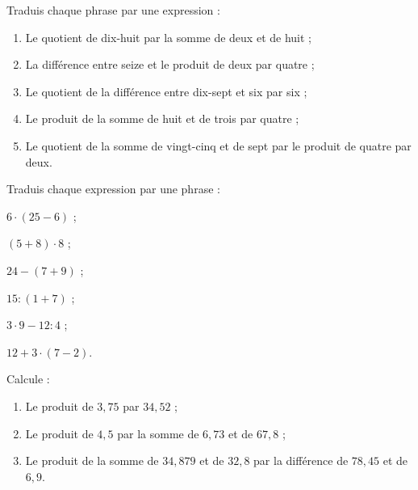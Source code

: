 \begin{exercice}
Traduis chaque phrase par une expression :
\begin{enumerate}
 \item Le quotient de dix-huit par la somme de deux et de huit ;
 \item La différence entre seize et le produit de deux par quatre ;
 \item Le quotient de la différence entre dix-sept et six par six ;
 \item Le produit de la somme de huit et de trois par quatre ;
 \item Le quotient de la somme de vingt-cinq et de sept par le produit de quatre par deux.
 \end{enumerate}
\end{exercice}


\begin{exercice}
Traduis chaque expression par une phrase :
\begin{colenumerate}{2}
 \item $6 \cdot (25 - 6)$ ;
 \item $(5 + 8) \cdot 8$ ;
 \item $24 - (7 + 9)$ ;
 \item $15 : (1 + 7)$ ;
 \item $3 \cdot 9 - 12 : 4$ ;
 \item $12 + 3 \cdot (7 - 2)$.
 \end{colenumerate}
\end{exercice} 


\begin{exercice}
Calcule :
\begin{enumerate}
 \item Le produit de $3,75$ par $34,52$ ;
 \item Le produit de $4,5$ par la somme de $6,73$ et de $67,8$ ;
 \item Le produit de la somme de $34,879$ et de $32,8$ par la différence de $78,45$ et de $6,9$.
 \end{enumerate}
\end{exercice} 





\vspace*{1.2em}



